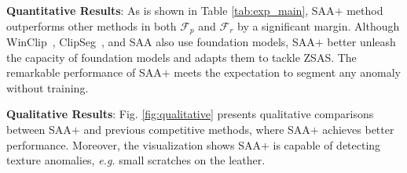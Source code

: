 \documentclass{article}
\begin{document}
\noindent\textbf{Quantitative Results}: As is shown in Table \ref{tab:exp_main}, SAA$+$ method outperforms other methods in both $\mathcal{F}_{p}$ and $\mathcal{F}_{r}$ by a significant margin. Although WinClip~\cite{jeong2023winclip}, ClipSeg~\cite{clipseg2022}, and SAA also use foundation models, SAA$+$ better unleash the capacity of foundation models and adapts them to tackle ZSAS. The remarkable performance of SAA$+$ meets the expectation to segment any anomaly without training.

\noindent\textbf{Qualitative Results}: Fig. \ref{fig:qualitative} presents qualitative comparisons between  SAA$+$ and previous competitive methods, where SAA$+$ achieves better performance. Moreover, the visualization shows SAA$+$ is capable of detecting texture anomalies, \textit{e.g.} small scratches on the leather. 
\end{document}
